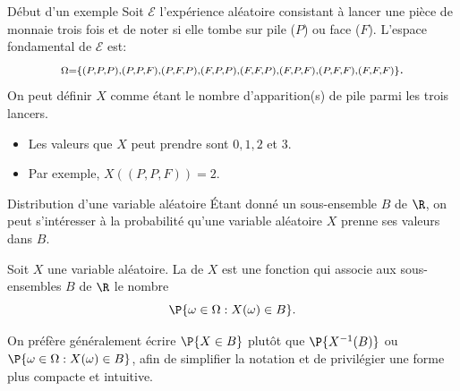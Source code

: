 \documentclass[nuit,charter,pied]{BeamerJS}
\begin{document}
\begin{frame}{Début d'un exemple}
	Soit $\mathcal{E}$ l'expérience aléatoire consistant à lancer une pièce de monnaie trois fois et de noter si elle tombe sur pile ($P$) ou face ($F$). L'espace fondamental de $\mathcal{E}$ est:
		\[\mathlarger{{\scriptstyle\Omega=\{(P,P,P),(P,P,F),(P,F,P),(F,P,P),(F,F,P),(F,P,F),(P,F,F),(F,F,F)\}}.}\]
		\pause
	On peut définir $X$ comme étant le nombre d'apparition(s) de pile parmi les trois lancers.
	\pause
	\begin{itemize}
		\item Les valeurs que $X$ peut prendre sont $0,1,2$ et $3$.
		\item Par exemple, $X\left((P,P,F)\right)=2$.
	\end{itemize}
\end{frame}
\begin{frame}{Distribution d'une variable aléatoire}
	Étant donné un sous-ensemble $B$ de $\R$, on peut s'intéresser à la probabilité qu'une variable aléatoire $X$ prenne ses valeurs dans $B$.\pause
	\begin{defn}{}
		Soit $X$ une variable aléatoire. La  de $X$ est une fonction qui associe aux sous-ensembles $B$ de $\R$ le nombre
		\[\P{\omega\in\Omega:X(\omega)\in B}.\]
	\end{defn}\pause
\begin{rem}
	On préfère généralement écrire $\P{X \in B}$ plutôt que $\P{X^{-1}(B)}$ ou $\P{\omega \in \Omega : X(\omega) \in B}$, afin de simplifier la notation et de privilégier une forme plus compacte et intuitive.
\end{rem}
\end{frame}
\end{document}
